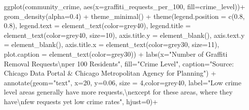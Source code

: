 \documentclass[
]{report}
\newenvironment{Shaded}{}{}
\newcommand{\AttributeTok}[1]{\textcolor[rgb]{0.65,0.15,0.64}{#1}}
\newcommand{\DecValTok}[1]{\textcolor[rgb]{0.60,0.41,0.00}{#1}}
\newcommand{\FloatTok}[1]{\textcolor[rgb]{0.60,0.41,0.00}{#1}}
\newcommand{\FunctionTok}[1]{\textcolor[rgb]{0.25,0.47,0.95}{#1}}
\newcommand{\NormalTok}[1]{\textcolor[rgb]{0.22,0.23,0.26}{#1}}
\newcommand{\SpecialCharTok}[1]{\textcolor[rgb]{0.00,0.52,0.74}{#1}}
\newcommand{\StringTok}[1]{\textcolor[rgb]{0.31,0.63,0.31}{#1}}
\begin{document}
\begin{Shaded}
\begin{Highlighting}[]
\FunctionTok{ggplot}\NormalTok{(community\_crime, }\FunctionTok{aes}\NormalTok{(}\AttributeTok{x=}\NormalTok{graffiti\_requests\_per\_100, }\AttributeTok{fill=}\NormalTok{crime\_level))}\SpecialCharTok{+}
  \FunctionTok{geom\_density}\NormalTok{(}\AttributeTok{alpha=}\FloatTok{0.4}\NormalTok{) }\SpecialCharTok{+}
  \FunctionTok{theme\_minimal}\NormalTok{() }\SpecialCharTok{+}
  \FunctionTok{theme}\NormalTok{(}\AttributeTok{legend.position =} \FunctionTok{c}\NormalTok{(}\FloatTok{0.8}\NormalTok{, }\FloatTok{0.8}\NormalTok{),}
        \AttributeTok{legend.text =} \FunctionTok{element\_text}\NormalTok{(}\AttributeTok{color=}\StringTok{\textquotesingle{}grey40\textquotesingle{}}\NormalTok{),}
        \AttributeTok{legend.title =} \FunctionTok{element\_text}\NormalTok{(}\AttributeTok{color=}\StringTok{\textquotesingle{}grey40\textquotesingle{}}\NormalTok{, }\AttributeTok{size=}\DecValTok{10}\NormalTok{),}
        \AttributeTok{axis.title.y =} \FunctionTok{element\_blank}\NormalTok{(),}
        \AttributeTok{axis.text.y =} \FunctionTok{element\_blank}\NormalTok{(),}
        \AttributeTok{axis.title.x =} \FunctionTok{element\_text}\NormalTok{(}\AttributeTok{color=}\StringTok{\textquotesingle{}grey30\textquotesingle{}}\NormalTok{, }\AttributeTok{size=}\DecValTok{11}\NormalTok{),}
        \AttributeTok{plot.caption =} \FunctionTok{element\_text}\NormalTok{(}\AttributeTok{color=}\StringTok{\textquotesingle{}grey30\textquotesingle{}}\NormalTok{)) }\SpecialCharTok{+}
  \FunctionTok{labs}\NormalTok{(}\AttributeTok{x=}\StringTok{"Number of Graffiti Removal Requests}\SpecialCharTok{\textbackslash{}n}\StringTok{per 100 Residents"}\NormalTok{,}
       \AttributeTok{fill=}\StringTok{"Crime Level"}\NormalTok{,}
       \AttributeTok{caption=}\StringTok{"Source: Chicago Data Portal \& Chicago Metropolitan Agency for Planning"}\NormalTok{) }\SpecialCharTok{+}
  \FunctionTok{annotate}\NormalTok{(}\AttributeTok{geom=}\StringTok{"text"}\NormalTok{, }\AttributeTok{x=}\DecValTok{20}\NormalTok{, }\AttributeTok{y=}\FloatTok{0.06}\NormalTok{, }\AttributeTok{size =} \DecValTok{4}\NormalTok{,}\AttributeTok{color=}\StringTok{\textquotesingle{}grey40\textquotesingle{}}\NormalTok{,}
           \AttributeTok{label=}\StringTok{"Low crime level areas generally have more requests,}\SpecialCharTok{\textbackslash{}n}\StringTok{except for these areas, where they have}\SpecialCharTok{\textbackslash{}n}\StringTok{few requests yet low crime rates"}\NormalTok{, }\AttributeTok{hjust=}\DecValTok{0}\NormalTok{)}\SpecialCharTok{+}

\end{Highlighting}
\end{Shaded}
\end{document}

